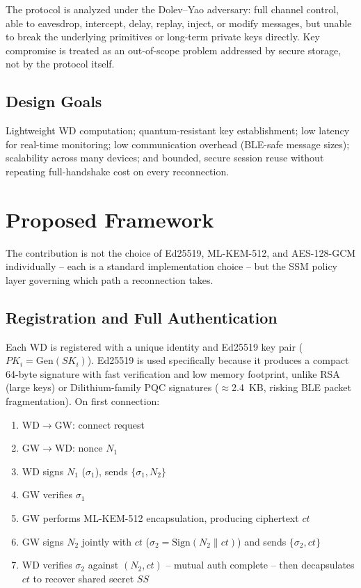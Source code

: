 \documentclass[conference]{IEEEtran}
\begin{document}
The protocol is analyzed under the Dolev--Yao adversary: full channel
control, able to eavesdrop, intercept, delay, replay, inject, or modify
messages, but unable to break the underlying primitives or long-term
private keys directly. Key compromise is treated as an out-of-scope problem
addressed by secure storage, not by the protocol itself.

\subsection{Design Goals}

Lightweight WD computation; quantum-resistant key establishment; low
latency for real-time monitoring; low communication overhead (BLE-safe
message sizes); scalability across many devices; and bounded, secure
session reuse without repeating full-handshake cost on every reconnection.

\section{Proposed Framework}

The contribution is not the choice of Ed25519, ML-KEM-512, and AES-128-GCM
individually -- each is a standard implementation choice -- but the SSM
policy layer governing which path a reconnection takes.

\subsection{Registration and Full Authentication}

Each WD is registered with a unique identity and Ed25519 key pair
($PK_i = \mathrm{Gen}(SK_i)$). Ed25519 is used specifically because it
produces a compact 64-byte signature with fast verification and low memory
footprint, unlike RSA (large keys) or Dilithium-family PQC signatures
($\approx$2.4~KB, risking BLE packet fragmentation). On first connection:

\begin{enumerate}
\item WD$\to$GW: connect request
\item GW$\to$WD: nonce $N_1$
\item WD signs $N_1$ ($\sigma_1$), sends $\{\sigma_1, N_2\}$
\item GW verifies $\sigma_1$
\item GW performs ML-KEM-512 encapsulation, producing ciphertext $ct$
\item GW signs $N_2$ jointly with $ct$ ($\sigma_2 = \mathrm{Sign}(N_2 \| ct)$) and sends $\{\sigma_2, ct\}$
\item WD verifies $\sigma_2$ against $(N_2, ct)$ -- mutual auth complete -- then decapsulates $ct$ to recover shared secret $SS$
\end{enumerate}
\end{document}
